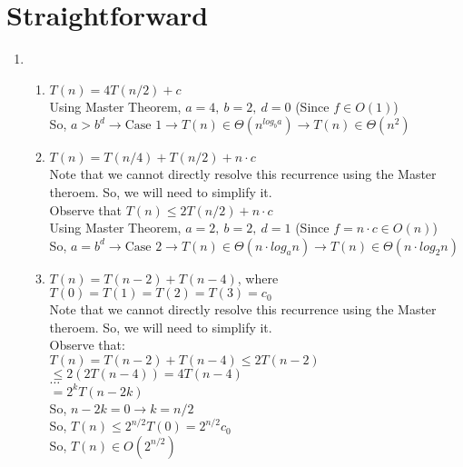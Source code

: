 \documentclass[a4paper]{article}
\begin{document}
\section{Straightforward}
    \begin{enumerate}
    
    \item \begin{enumerate}
        \item $T(n) = 4T(n/2) + c$ \\

        Using Master Theorem, $a = 4,\ b = 2,\ d = 0$ (Since $f \in O(1)$) \\
        So, $a > b^d \rightarrow \text{Case 1} \rightarrow T(n) \in \Theta(n^{log_ba}) \rightarrow T(n) \in \Theta(n^2)$ \\

        \item $T(n) = T(n/4) + T(n/2) + n \cdot c$ \\
        Note that we cannot directly resolve this recurrence using the Master theroem. So, we will need to simplify it. \\
        
        Observe that $T(n) \leq 2T(n/2) + n \cdot c$ \\
        Using Master Theorem, $a = 2,\ b = 2,\ d = 1$ (Since $f = n \cdot c\in O(n)$) \\
        So, $a = b^d \rightarrow \text{Case 2} \rightarrow T(n) \in \Theta(n \cdot log_{a}n) \rightarrow T(n) \in \Theta(n \cdot log_{2}n)$ \\


        \item $T(n) = T(n-2) + T(n-4)$, where $T(0) = T(1) = T(2) = T(3) = c_0$ \\
        Note that we cannot directly resolve this recurrence using the Master theroem. So, we will need to simplify it. \\

        Observe that:\\
        $T(n) = T(n-2) + T(n-4) \leq 2T(n-2)$ \\
        $\leq 2(2T(n-4)) = 4T(n-4)$ \\
        $\dots$\\
        $= 2^kT(n-2k)$ \\
        So, $n-2k = 0 \rightarrow k = n/2$ \\
        So, $T(n) \leq 2^{n/2}T(0) = 2^{n/2}c_0$ \\
        So, $T(n) \in O(2^{n/2})$ \\


\end{enumerate}
\end{enumerate}
\end{document}
